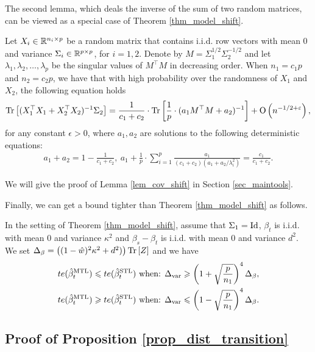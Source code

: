 The second lemma, which deals the inverse of the sum of two random matrices, can be viewed as a special case of Theorem \ref{thm_model_shift}.
\begin{lemma}\label{lem_cov_shift}
	Let $X_i\in\mathbb{R}^{n_i\times p}$ be a random matrix that contains i.i.d. row vectors with mean $0$ and variance $\Sigma_i\in\mathbb{R}^{p\times p}$, for $i = 1, 2$.
	Denote by $M = \Sigma_1^{1/2}\Sigma_2^{-1/2}$ and let $\lambda_1, \lambda_2, \dots, \lambda_p$ be the singular values of $M^{\top}M$ in decreasing order.
	When $n_1 = c_1 p$ and $n_2 = c_2 p$, we have that with high probability over the randomness of $X_1$ and $X_2$, the following equation holds
	\begin{align}%
		\bigtr{(X_1^{\top}X_1 + X_2^{\top}X_2)^{-1}\Sigma_2} = \frac{1}{c_1+c_2}\cdot \bigtr{ \frac{1}{p}\cdot(a_1 M^\top M + a_2)^{-1}} +\bigo{ n^{-1/2+\epsilon}},
	\end{align}
	for any constant $\epsilon>0$, where $a_1, a_2$ are solutions to the following deterministic equations:
	\begin{align}
		a_1 + a_2 = 1- \frac{1}{c_1 + c_2},~ a_1 + \frac{1}{p}\cdot\sum_{i=1}^p \frac{a_1}{(c_1 + c_2)(a_1 + a_2/ \lambda_i^2)} = \frac{c_1}{c_1 + c_2}. \label{eq_a12}
	\end{align}
\end{lemma}
We will give the proof of Lemma \ref{lem_cov_shift} in Section \ref{sec_maintools}.

Finally, we can get a bound tighter than Theorem \ref{thm_model_shift} as follows.
\begin{lemma}\label{prop_model_shift_tight}
		In the setting of Theorem \ref{thm_model_shift}, assume that $\Sigma_1 =\operatorname{Id}$,
		$\beta_t$ is i.i.d. with mean $0$ and variance $\kappa^2$ and $\beta_s - \beta_t$ is i.i.d. with mean $0$ and variance $d^2$.
		We set $\Delta_{\beta} = \left({(1 - \hat{w})^2 \kappa^2 + d^2)}\right) \operatorname{Tr}\left[Z\right]$
		and we have
		\begin{align*}
			te(\hat{\beta}_t^{\text{MTL}}) \leqslant te(\hat{\beta}_t^{\text{STL}}) \text{ when: } & \Delta_{\text{var}} \geqslant \left({1 + \sqrt{\frac{p}{n_1}}}\right)^4 \Delta_{\beta}, \\
			te(\hat{\beta}_t^{\text{MTL}}) \geqslant te(\hat{\beta}_t^{\text{STL}}) \text{ when: } & \Delta_{\text{var}} \leqslant \left({1 - \sqrt{\frac{p}{n_1}}}\right)^4 \Delta_{\beta}.
		\end{align*}
\end{lemma}

\subsection{Proof of Proposition \ref{prop_dist_transition}}\label{app_proof_31}

